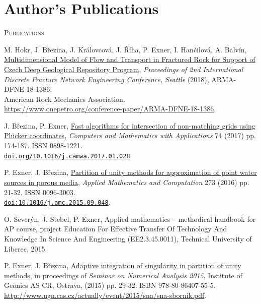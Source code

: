 \documentclass[bibliography=totocnumbered,dvipsnames,FM,Dis, EN]{tulthesis_autoreferat}
\begin{document}
\chapter{Author's Publications} \label{chap:publications}
% 
{\large\textsc{Publications}}
\begin{itemize}[label={}, leftmargin=*]

{\small
\item
M. Hokr, J. B{\v r}ezina, J. Kr{\' a}lovcov{\' a}, J. {\v R}{\' i}ha, P. Exner, I. Han{\v c}ilov{\' a}, A. Balv{\' i}n,
\href{https://www.onepetro.org/conference-paper/ARMA-DFNE-18-1386}
{Multidimensional Model of Flow and Transport in Fractured Rock for Support of Czech Deep Geological Repository Program},
\emph{Proceedings of 2nd International Discrete Fracture Network Engineering Conference, Seattle} (2018), ARMA-DFNE-18-1386, \\
American Rock Mechanics Association.\\
\url{https://www.onepetro.org/conference-paper/ARMA-DFNE-18-1386}.

\item
J. B{\v r}ezina, P. Exner, \href{http://www.sciencedirect.com/science/article/pii/S0898122117300792}{Fast algorithms for intersection of non-mat\-ching grids using Plücker coordinates},
\emph{Computers and Mathematics with Applications} 74 (2017) pp. 174-187. ISSN 0898-1221. \\
\href{https://doi.org/10.1016/j.camwa.2017.01.028}{\texttt{doi.org/10.1016/j.camwa.2017.01.028}}.

\item
P. Exner, J. B{\v r}ezina, \href{http://www.sciencedirect.com/science/article/pii/S0096300315012862}{Partition of unity methods for approximation of point water sources in porous media},
\emph{Applied Mathematics and Computation} 273 (2016) pp. 21-32. ISSN 0096-3003.\\
\href{http://dx.doi.org/10.1016/j.amc.2015.09.048}{\texttt{doi:10.1016/j.amc.2015.09.048}}.

\item
O. Sever{\' y}n, J. Stebel, P. Exner, Applied mathematics -- methodical handbook for AP course,
project Education For Effective Transfer Of Technology And Knowledge In Science And Engineering (EE2.3.45.0011),
Technical University of Liberec, 2015.

\item
P. Exner, J. B{\v r}ezina, \href{http://www.ugn.cas.cz/actually/event/2015/sna/sna-sbornik.pdf}{Adaptive integration of singularity in partition of unity methods},
in proceedings of \emph{Seminar on Numerical Analysis 2015}, Institute of Geonics AS CR, Ostrava, (2015) pp. 29-32. ISBN 978-80-86407-55-5. \\
\url{http://www.ugn.cas.cz/actually/event/2015/sna/sna-sbornik.pdf}.

}
\end{itemize}
\end{document}
